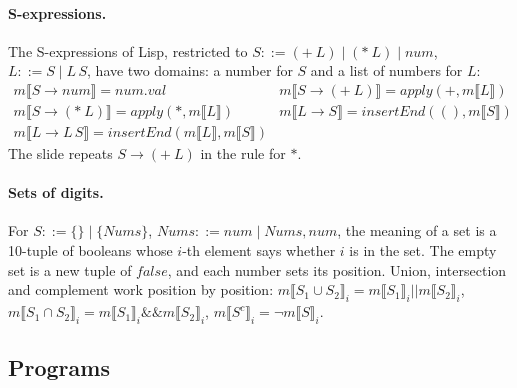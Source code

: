\paragraph{S-expressions.} The S-expressions of Lisp, restricted to
$S ::= (+\ L) \mid (*\ L) \mid \mathit{num}$, $L ::= S \mid L\, S$, have two domains:
a number for $S$ and a list of numbers for $L$:
\[
\begin{array}{ll}
m\llbracket S \to \mathit{num} \rrbracket = \mathit{num.val} &
m\llbracket S \to (+\ L) \rrbracket = \mathit{apply}(+, m\llbracket L \rrbracket) \\
m\llbracket S \to (*\ L) \rrbracket = \mathit{apply}(*, m\llbracket L \rrbracket) &
m\llbracket L \to S \rrbracket = \mathit{insertEnd}((), m\llbracket S \rrbracket) \\
m\llbracket L \to L\, S \rrbracket = \mathit{insertEnd}(m\llbracket L \rrbracket, m\llbracket S \rrbracket)
\end{array}
\]
The slide repeats $S \to (+\ L)$ in the rule for $*$.

\paragraph{Sets of digits.} For $S ::= \{\} \mid \{\mathit{Nums}\}$,
$\mathit{Nums} ::= \mathit{num} \mid \mathit{Nums}, \mathit{num}$, the meaning of a set is a 10-tuple of
booleans whose $i$-th element says whether $i$ is in the set. The empty set is
a new tuple of $\mathit{false}$, and each number sets its position. Union,
intersection and complement work position by position:
$m\llbracket S_1 \cup S_2 \rrbracket_i = m\llbracket S_1 \rrbracket_i \mathbin{||} m\llbracket S_2 \rrbracket_i$,
$m\llbracket S_1 \cap S_2 \rrbracket_i = m\llbracket S_1 \rrbracket_i \mathbin{\&\&} m\llbracket S_2 \rrbracket_i$,
$m\llbracket S^c \rrbracket_i = \neg m\llbracket S \rrbracket_i$.

\subsection{Programs}

